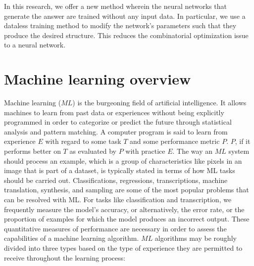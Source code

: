 In this research, we offer a new method wherein the neural networks that generate the answer are trained without any input data. In particular, we use a dataless training method to modify the network's parameters such that they produce the desired structure. This reduces the combinatorial optimization issue to a neural network.

\section{Machine learning overview}

Machine learning ($ML$) is the burgeoning field of artificial intelligence. It allows machines to learn from past data or experiences without being explicitly programmed in order to categorize or predict the future through statistical analysis and pattern matching. A computer program is said to learn from experience $E$ with regard to some task $T$ and some performance metric $P$. $P$, if it performs better on $T$ as evaluated by $P$ with practice $E$. The way an $ML$ system should process an example, which is a group of characteristics like pixels in an image that is part of a dataset, is typically stated in terms of how ML tasks should be carried out. Classifications, regressions, transcriptions, machine translation, synthesis, and sampling are some of the most popular problems that can be resolved with ML. For tasks like classification and transcription, we frequently measure the model's accuracy, or alternatively, the error rate, or the proportion of examples for which the model produces an incorrect output. These quantitative measures of performance are necessary in order to assess the capabilities of a machine learning algorithm. $ML$ algorithms may be roughly divided into three types based on the type of experience they are permitted to receive throughout the learning process:

